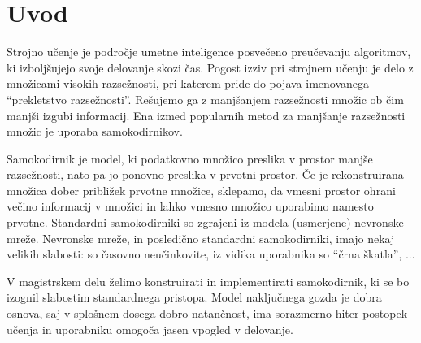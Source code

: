 \documentclass[12pt,a4paper,twoside]{article}
\theoremstyle{definition} %
\theoremstyle{plain} %
\numberwithin{equation}{section}  %
\begin{document}


\section{Uvod}



Strojno učenje je področje umetne inteligence posvečeno preučevanju algoritmov, ki izboljšujejo svoje delovanje skozi čas.
Pogost izziv pri strojnem učenju je delo z množicami visokih razsežnosti, pri katerem pride do pojava imenovanega ``prekletstvo razsežnosti''.
Rešujemo ga z manjšanjem razsežnosti množic ob čim manjši izgubi informacij.
Ena izmed popularnih metod za manjšanje razsežnosti množic je uporaba samokodirnikov.

Samokodirnik je model, ki podatkovno množico preslika v prostor manjše razsežnosti, nato pa jo ponovno preslika v prvotni prostor. %
Če je rekonstruirana množica dober približek prvotne množice, sklepamo, da vmesni prostor ohrani večino informacij v množici in lahko vmesno množico uporabimo namesto prvotne. %
Standardni samokodirniki so zgrajeni iz modela (usmerjene) nevronske mreže.
Nevronske mreže, in posledično standardni samokodirniki, imajo nekaj velikih slabosti: so časovno neučinkovite, iz vidika uporabnika so ``črna škatla'', ...

V magistrskem delu želimo konstruirati in implementirati samokodirnik, ki se bo izognil slabostim standardnega pristopa.
Model naključnega gozda je dobra osnova, saj v splošnem dosega dobro natančnost, ima sorazmerno hiter postopek učenja in uporabniku omogoča jasen vpogled v delovanje.
\end{document}
